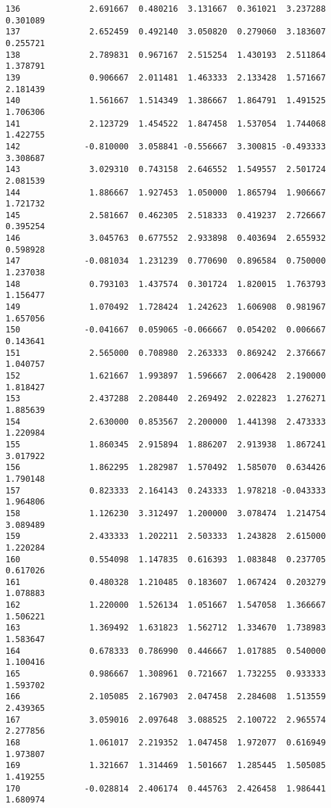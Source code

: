 \documentclass[11pt]{article}
\begin{document}
\begin{Verbatim}[commandchars=\\\{\}]
136              2.691667  0.480216  3.131667  0.361021  3.237288  0.301089
137              2.652459  0.492140  3.050820  0.279060  3.183607  0.255721
138              2.789831  0.967167  2.515254  1.430193  2.511864  1.378791
139              0.906667  2.011481  1.463333  2.133428  1.571667  2.181439
140              1.561667  1.514349  1.386667  1.864791  1.491525  1.706306
141              2.123729  1.454522  1.847458  1.537054  1.744068  1.422755
142             -0.810000  3.058841 -0.556667  3.300815 -0.493333  3.308687
143              3.029310  0.743158  2.646552  1.549557  2.501724  2.081539
144              1.886667  1.927453  1.050000  1.865794  1.906667  1.721732
145              2.581667  0.462305  2.518333  0.419237  2.726667  0.395254
146              3.045763  0.677552  2.933898  0.403694  2.655932  0.598928
147             -0.081034  1.231239  0.770690  0.896584  0.750000  1.237038
148              0.793103  1.437574  0.301724  1.820015  1.763793  1.156477
149              1.070492  1.728424  1.242623  1.606908  0.981967  1.657056
150             -0.041667  0.059065 -0.066667  0.054202  0.006667  0.143641
151              2.565000  0.708980  2.263333  0.869242  2.376667  1.040757
152              1.621667  1.993897  1.596667  2.006428  2.190000  1.818427
153              2.437288  2.208440  2.269492  2.022823  1.276271  1.885639
154              2.630000  0.853567  2.200000  1.441398  2.473333  1.220984
155              1.860345  2.915894  1.886207  2.913938  1.867241  3.017922
156              1.862295  1.282987  1.570492  1.585070  0.634426  1.790148
157              0.823333  2.164143  0.243333  1.978218 -0.043333  1.964806
158              1.126230  3.312497  1.200000  3.078474  1.214754  3.089489
159              2.433333  1.202211  2.503333  1.243828  2.615000  1.220284
160              0.554098  1.147835  0.616393  1.083848  0.237705  0.617026
161              0.480328  1.210485  0.183607  1.067424  0.203279  1.078883
162              1.220000  1.526134  1.051667  1.547058  1.366667  1.506221
163              1.369492  1.631823  1.562712  1.334670  1.738983  1.583647
164              0.678333  0.786990  0.446667  1.017885  0.540000  1.100416
165              0.986667  1.308961  0.721667  1.732255  0.933333  1.593702
166              2.105085  2.167903  2.047458  2.284608  1.513559  2.439365
167              3.059016  2.097648  3.088525  2.100722  2.965574  2.277856
168              1.061017  2.219352  1.047458  1.972077  0.616949  1.973807
169              1.321667  1.314469  1.501667  1.285445  1.505085  1.419255
170             -0.028814  2.406174  0.445763  2.426458  1.986441  1.680974

\end{Verbatim}
\end{document}
